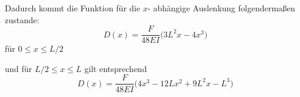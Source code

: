 Dadurch kommt die Funktion für die $x$- abhängige Auslenkung folgendermaßen zustande: \begin{equation}
   D(x) = \frac{F}{48EI} \bigl( 3L^2 x -4x^3 \bigr)
   \label{eqn:D2_gleich}
\end{equation} für $0 \leq x \leq L/2$

und für $L/2 \leq x \leq L$ gilt entsprechend \begin{equation}
    D(x) = \frac{F}{48EI} \bigl( 4x^3 - 12Lx^2 + 9L^2 x - L^3 \bigr)
    \label{eqn:D3_gleich}
\end{equation}

